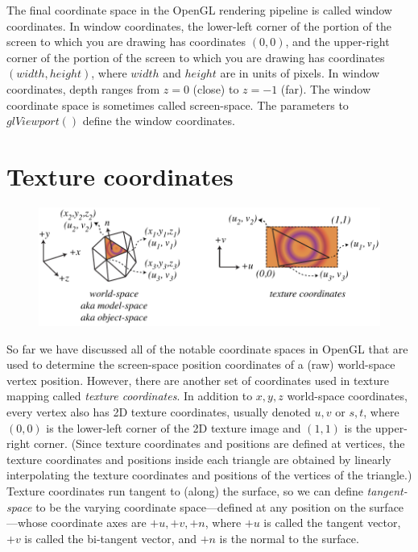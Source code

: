 \documentclass{article}
\begin{document}
The final coordinate space in the OpenGL rendering pipeline is called window coordinates.
In window coordinates, the lower-left corner of the portion
of the screen to which you are drawing has coordinates $(0,0)$,
and the upper-right corner of the portion of the screen to which you are drawing
has coordinates $(width, height)$, where $width$ and $height$ are in units of
pixels.  In window coordinates, depth ranges from $z=0$ (close) to $z=-1$ (far).
The window coordinate space is sometimes called screen-space.
The parameters to $glViewport()$ define the window coordinates.

\section{Texture coordinates}
\begin{figure}
\centering
\includegraphics[width=\textwidth]{figures/texcoords}
\end{figure}

So far we have discussed all of the notable coordinate spaces in OpenGL
that are used to determine the screen-space position coordinates of a (raw)
world-space vertex position.  However, there are another set of coordinates
used in texture mapping called \emph{texture coordinates}.  In addition
to $x,y,z$ world-space coordinates, every vertex also has 2D texture
coordinates, usually denoted $u,v$ or $s,t$, where $(0,0)$ is the lower-left
corner of the 2D texture image and $(1,1)$ is the upper-right corner.
(Since texture coordinates and positions are defined at vertices,
the texture coordinates and positions inside each triangle are
obtained by linearly interpolating the texture coordinates and positions
of the vertices of the triangle.)
Texture coordinates run tangent to (along) the surface, so we can define
\emph{tangent-space} to be the varying coordinate space---defined at any
position on the surface---whose coordinate axes are $+u, +v, +n$, where
$+u$ is called the tangent vector, $+v$ is called the bi-tangent vector,
and $+n$ is the normal to the surface.
\end{document}
